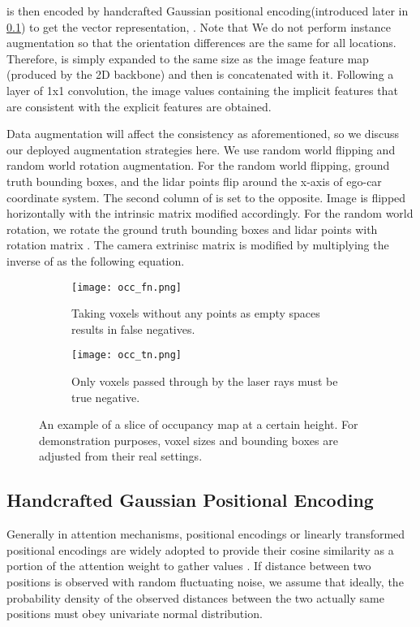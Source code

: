 \documentclass[10pt,twocolumn,letterpaper]{article}
\begin{document}
 is then encoded by handcrafted Gaussian positional encoding(introduced later in \cref{subsec:gaussian_positional_encoding}) to get the vector representation, . Note that We do not perform instance augmentation \cite{yan2018second, Huang2021BEVDetHM} so that the orientation differences are the same for all locations. Therefore,  is simply expanded to the same size as the image feature map (produced by the 2D backbone) and then is concatenated with it. Following a layer of 1x1 convolution, the image values containing the implicit features that are consistent with the explicit features are obtained.

Data augmentation will affect the consistency as aforementioned, so we discuss our deployed augmentation strategies here. We use random world flipping and random world rotation augmentation. For the random world flipping, ground truth bounding boxes, and the lidar points flip around the x-axis of ego-car coordinate system. The second column of  is set to the opposite. Image is flipped horizontally with the intrinsic matrix modified accordingly. For the random world rotation, we rotate the ground truth bounding boxes and lidar points with rotation matrix . The camera extrinisc matrix is modified by multiplying the inverse of  as the following equation.



\begin{figure}
  \centering
  \begin{subfigure}{3.7cm}
    \texttt{[image: occ\_fn.png]}
    \caption{Taking voxels without any points as empty spaces results in false negatives.}
    \label{fig:occ_fn}
  \end{subfigure}
  \hspace{0.5cm}
  \begin{subfigure}{3.7cm}
    \texttt{[image: occ\_tn.png]}
    \caption{Only voxels passed through by the laser rays must be true negative.}
    \label{fig:occ_tn}
  \end{subfigure}
  \caption{An example of a slice of occupancy map at a certain height. For demonstration purposes, voxel sizes and bounding boxes are adjusted from their real settings.}
  \label{fig:occ}
\end{figure}

\subsection{Handcrafted Gaussian Positional Encoding}
\label{subsec:gaussian_positional_encoding}
Generally in attention mechanisms, positional encodings or linearly transformed positional encodings are widely adopted to provide their cosine similarity as a portion of the attention weight to gather values \cite{dai-etal-2019-transformer, JMLR:v21:20-074}. If distance between two positions is observed with random fluctuating noise, we assume that ideally, the probability density of the observed distances between the two actually same positions must obey univariate normal distribution.
\end{document}
